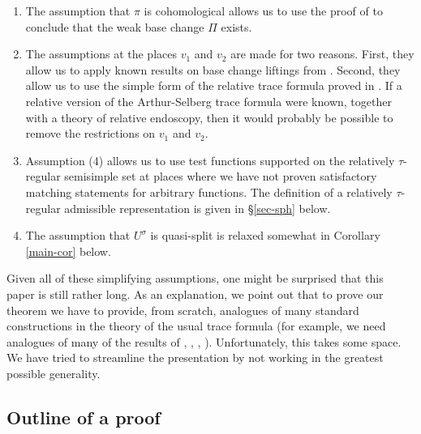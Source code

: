 \documentclass[12pt]{amsart}
\theoremstyle{remark}
\numberwithin{equation}{section}
\theoremstyle{definition}
\numberwithin{equation}{subsection}
\begin{document}
\begin{enumerate}
\item
The assumption that $\pi$ is cohomological allows us to use the proof of \cite[Theorem 3.1.4]{HarLab} to conclude that the weak base change $\Pi$ exists.

\item The assumptions at the places $v_1$ and $v_2$ are made for two reasons.  First, they allow us to apply known results on base change liftings from \cite{HarLab}.  Second,
they allow us to use the simple form of the relative
trace formula proved in \cite{Hahn}.  If a relative version of the
Arthur-Selberg trace formula were known, together with a theory of relative endoscopy,
  then it would probably be possible to remove the
  restrictions on $v_1$ and $v_2$.

\item Assumption (4) allows us to use test functions supported on the relatively $\tau$-regular semisimple set at places where we have not proven satisfactory matching statements for arbitrary functions.  The definition of a relatively $\tau$-regular admissible representation is given in \S \ref{sec-sph} below.

\item The assumption that $U^{\sigma}$ is quasi-split
is relaxed somewhat in Corollary \ref{main-cor} below.

\end{enumerate}


Given all of these simplifying assumptions, one might be surprised that this paper is still rather long.  As an explanation, we point out that to prove our theorem we have to provide, from scratch, analogues of
    many standard constructions in the theory of the usual trace formula (for example, we need analogues of many of the results of \cite{KottRatConj}, \cite{KottStCusp},  \cite{KottEllSing}, \cite{KottTama}).  Unfortunately, this takes some space.  We have tried to streamline the presentation by not working in the greatest possible generality.




\subsection{Outline of a proof}
\end{document}
